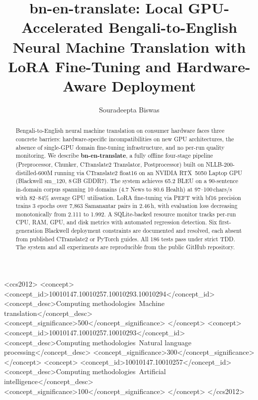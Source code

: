 \documentclass[sigconf]{acmart}
\newcommand{\TRAINDURATION}{2.46\,h}
\begin{document}

\title{bn-en-translate: Local GPU-Accelerated Bengali-to-English Neural
Machine Translation with LoRA Fine-Tuning and Hardware-Aware Deployment}

\author{Souradeepta Biswas}

\begin{CCSXML}
<ccs2012>
 <concept>
  <concept_id>10010147.10010257.10010293.10010294</concept_id>
  <concept_desc>Computing methodologies~Machine translation</concept_desc>
  <concept_significance>500</concept_significance>
 </concept>
 <concept>
  <concept_id>10010147.10010257.10010293</concept_id>
  <concept_desc>Computing methodologies~Natural language processing</concept_desc>
  <concept_significance>300</concept_significance>
 </concept>
 <concept>
  <concept_id>10010147.10010257</concept_id>
  <concept_desc>Computing methodologies~Artificial intelligence</concept_desc>
  <concept_significance>100</concept_significance>
 </concept>
</ccs2012>
\end{CCSXML}


\begin{abstract}
Bengali-to-English neural machine translation on consumer hardware faces three
concrete barriers: hardware-specific incompatibilities on new GPU architectures,
the absence of single-GPU domain fine-tuning infrastructure, and no per-run
quality monitoring.
We describe \textbf{bn-en-translate}, a fully offline four-stage pipeline
(Preprocessor, Chunker, CTranslate2 Translator, Postprocessor) built on
NLLB-200-distilled-600M running via CTranslate2 float16 on an NVIDIA RTX~5050
Laptop GPU (Blackwell sm\_120, 8\,GB GDDR7).
The system achieves 65.2 BLEU on a 90-sentence in-domain corpus spanning 10
domains (4.7 News to 80.6 Health) at 97--100\,chars/s with 82--84\%
average GPU utilisation.
LoRA fine-tuning via PEFT with bf16 precision trains 3 epochs over 7,863
Samanantar pairs in \TRAINDURATION, with evaluation loss decreasing monotonically
from 2.111 to 1.992.
A SQLite-backed resource monitor tracks per-run CPU, RAM, GPU, and disk metrics
with automated regression detection.
Six first-generation Blackwell deployment constraints are documented and resolved,
each absent from published CTranslate2 or PyTorch guides.
All 186 tests pass under strict TDD.
The system and all experiments are reproducible from the public GitHub repository.
\end{abstract}
\end{document}
